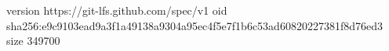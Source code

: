 version https://git-lfs.github.com/spec/v1
oid sha256:e9c9103ead9a3f1a49138a9304a95ec4f5e7f1b6c53ad60820227381f8d76ed3
size 349700

